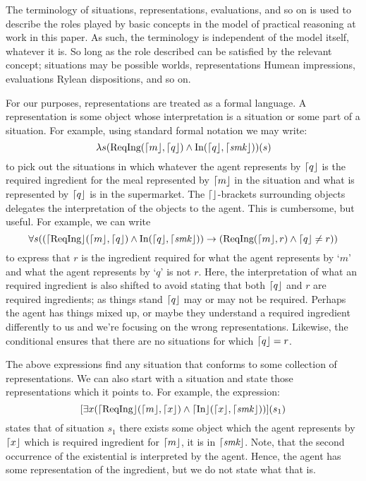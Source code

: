 \documentclass[10pt]{article}
\begin{document}
\newpage




The terminology of situations, representations, evaluations, and so on is used to describe the roles played by basic concepts in the model of practical reasoning at work in this paper.
As such, the terminology is independent of the model itself, whatever it is.
So long as the role described can be satisfied by the relevant concept; situations may be possible worlds, representations Humean impressions, evaluations Rylean dispositions, and so on.

For our purposes, representations are treated as a formal language.
A representation is some object whose interpretation is a situation or some part of a situation.
For example, using standard formal notation we may write:
\[
  \lambda s(
  \text{ReqIng}(\mathord{\lceil{m}\rfloor},\mathord{\lceil{q}\rfloor})
  \land \text{In}(\mathord{\lceil{q}\rfloor}, \mathord{\lceil{\text{\emph{smk}}}\rfloor})
  )(s)
\]
to pick out the situations in which whatever the agent represents by  \(\mathord{\lceil{q}\rfloor}\) is the required ingredient for the meal represented by \(\mathord{\lceil{m}\rfloor}\) in the situation and what is represented by \(\mathord{\lceil{q}\rfloor}\) is in the supermarket.
The \(\mathord{\lceil{\space}\rfloor}\)-brackets surrounding objects delegates the interpretation of the objects to the agent.
This is cumbersome, but useful.
For example, we can write
\[
  \forall s(
  (
  \mathord{\lceil{\text{ReqIng}}\rfloor}(\mathord{\lceil{m}\rfloor},\mathord{\lceil{q}\rfloor})
  \land \text{In}(\mathord{\lceil{q}\rfloor}, \mathord{\lceil{\text{\emph{smk}}}\rfloor})
  )
  \rightarrow
  (
  \text{ReqIng}(\mathord{\lceil{m}\rfloor},r)
  \land \mathord{\lceil{q}\rfloor} \ne r
  )
  )
\]
to express that \(r\) is the ingredient required for what the agent represents by `\(m\)' and what the agent represents by `\(q\)' is not \(r\).
Here, the interpretation of what an required ingredient is also shifted to avoid stating that both \(\mathord{\lceil{q}\rfloor}\) and \(r\) are required ingredients; as things stand \(\mathord{\lceil{q}\rfloor}\) may or may not be required.
Perhaps the agent has things mixed up, or maybe they understand a required ingredient differently to us and we're focusing on the wrong representations.
Likewise, the conditional ensures that there are no situations for which \(\mathord{\lceil{q}\rfloor} = r\).

The above expressions find any situation that conforms to some collection of representations.
We can also start with a situation and state those representations which it points to.
For example, the expression:
\[
  [\exists x(
  \mathord{\lceil{\text{ReqIng}}\rfloor}(\mathord{\lceil{m}\rfloor},\mathord{\lceil{x}\rfloor})
  \land \mathord{\lceil{\text{In}}\rfloor}(\mathord{\lceil{x}\rfloor}, \mathord{\lceil{\text{\emph{smk}}}\rfloor})
  )](s_{1})
\]
states that of situation \(s_{1}\) there exists some object which the agent represents by \(\mathord{\lceil{x}\rfloor}\) which is required ingredient for \(\mathord{\lceil{m}\rfloor}\), it is in \(\mathord{\lceil{\emph{smk}}\rfloor}\).
Note, that the second occurrence of the existential is interpreted by the agent.
Hence, the agent has some representation of the ingredient, but we do not state what that is.
\end{document}
